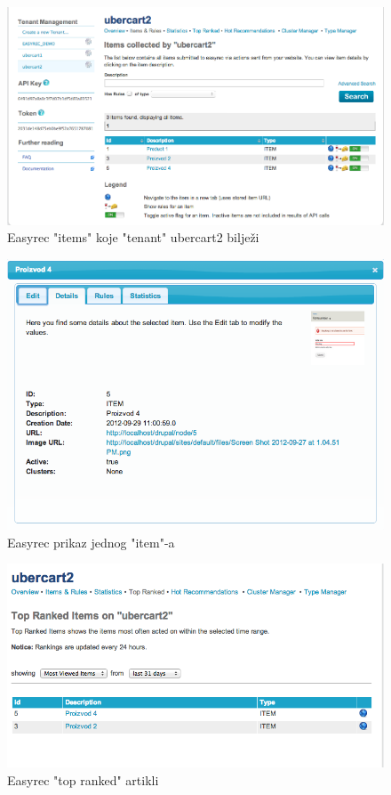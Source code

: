 \documentclass[times, utf8, seminar]{fit}
\begin{document}
{{{\begin{figure}[H]
\centering
\includegraphics[width=12cm]{img/easyrec_2_item.png}
\caption{Easyrec "items" koje "tenant" ubercart2 bilježi}
\end{figure}


\begin{figure}[H]
\centering
\includegraphics[width=12cm]{img/easyrec_3_item.png}
\caption{Easyrec prikaz jednog "item"-a}
\end{figure}

\begin{figure}[H]
\centering
\includegraphics[width=12cm]{img/easyrec_4_top_ranked.png}
\caption{Easyrec "top ranked" artikli}
\end{figure}

}}}
\end{document}

